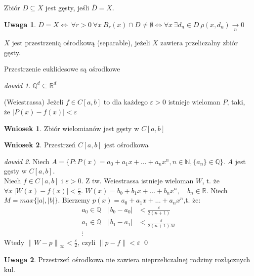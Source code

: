 \documentclass[twoside,10pt]{article}
\newcommand{\norm}[1]{\left\lVert#1\right\rVert}
\theoremstyle{definition}
\theoremstyle{definition}
\theoremstyle{definition}
\theoremstyle{definition}
\theoremstyle{remark}
\newtheorem*{dd}{dowód}
\theoremstyle{definition}
\newtheorem*{uw}{Uwaga}
\theoremstyle{definition}
\newtheorem*{wn}{Wniosek}
\theoremstyle{definition}
\theoremstyle{definition}
\theoremstyle{definition}
\theoremstyle{definition}
\begin{document}
\begin{df} Zbiór $D \subseteq X$ jest gęsty, jeśli $\overline{D} = X$. \end{df}
\begin{uw} $\overline{D} = X \Leftrightarrow \ \forall r > 0 \ \forall x \ B_r(x) \cap D \neq \emptyset \Leftrightarrow \forall x \ \exists d_n \in D \ \rho(x,d_n) \underset{n}{\rightarrow} 0$ \end{uw}
\begin{df} $X$ jest przestrzenią ośrodkową (separable), jeżeli $X$ zawiera przeliczalny zbiór gęsty.\end{df}  
\begin{tw} Przestrzenie euklidesowe są ośrodkowe \end{tw} 
\begin{dd} $\mathbb{Q}^d \subseteq \mathbb{R}^d $ \end{dd} 
\begin{tw}(Weiestrassa) Jeżeli $f \in C[a,b]$ to dla każdego $\varepsilon > 0$ istnieje wieloman $P$, taki, że $|P(x)-f(x)| < \varepsilon$ \end{tw}
\begin{wn} Zbiór wielomianów jest gęsty w $C[a,b]$ \end{wn} 
\begin{wn} Przestrzeń $C[a,b]$ jest ośrodkowa \end{wn}
\begin{dd} 
    Niech $A = \{P : P(x) = a_0 + a_1 x + \ldots + a_n x^n, n \in \mathbb{N} , \{a_n\} \in \mathbb{Q} \}$. $A$ jest gęsty w $C[a,b]$. \\ 
    Niech $f \in C[a,b]$ i $ \varepsilon > 0$. Z tw. Weiestrassa istnieje wieloman $W$, t. że $\forall x \ |W(x) - f(x)| < \frac{\varepsilon}{2}$.
    $W(x) = b_0 + b_1 x + \ldots + b_n x^n, \quad b_n \in \mathbb{R}$. Niech $M = max\{|a|,|b|\}$. Bierzemy $p(x) = a_0 + a_1 x + \ldots + a_n x^n$,t. że: 
    \begin{align*}
        a_0 \in \mathbb{Q} \quad |b_0 - a_0| &< \frac{\varepsilon}{2(n+1)}\\ 
        a_1 \in \mathbb{Q} \quad |b_1 - a_1| &< \frac{\varepsilon}{2(n+1)M} \\ 
        \vdots
    \end{align*}
    Wtedy $\norm{W-p}_\infty < \frac{\varepsilon}{2}$, czyli $\norm{p-f} < \varepsilon$ \hfill \qed  
\end{dd} 
\begin{uw} Przestrzeń ośrodkowa nie zawiera nieprzeliczalnej rodziny rozłącznych kul. \end{uw} 
\end{document}
